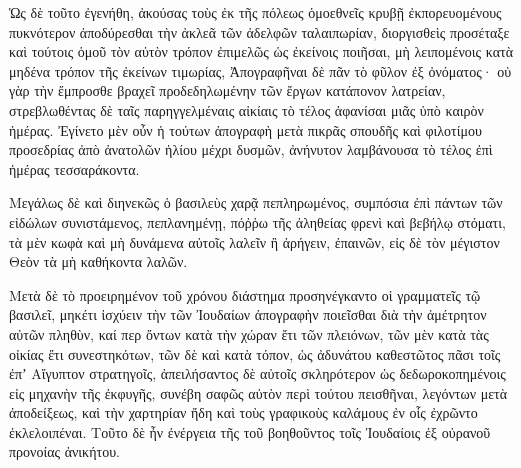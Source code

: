 {\par }{\PP {}Ὡς δὲ τοῦτο ἐγενήθη, ἀκούσας τοὺς ἐκ τῆς πόλεως ὁμοεθνεῖς κρυβῇ ἐκπορευομένους πυκνότερον ἀποδύρεσθαι τὴν ἀκλεᾶ τῶν ἀδελφῶν ταλαιπωρίαν,
διοργισθεὶς προσέταξε καὶ τούτοις ὁμοῦ τὸν αὐτὸν τρόπον ἐπιμελῶς ὡς ἐκείνοις ποιῆσαι, μὴ λειπομένοις κατὰ μηδένα τρόπον τῆς ἐκείνων τιμωρίας, Ἀπογραφῆναι δὲ πᾶν τὸ φῦλον ἐξ ὀνόματος·
οὐ γὰρ τὴν ἔμπροσθε βραχεῖ προδεδηλωμένην τῶν ἔργων κατάπονον λατρείαν, στρεβλωθέντας δὲ ταῖς παρηγγελμέναις αἰκίαις τὸ τέλος ἀφανίσαι μιᾶς ὑπὸ καιρὸν ἡμέρας.
Ἐγίνετο μὲν οὖν ἡ τούτων ἀπογραφὴ μετὰ πικρᾶς σπουδῆς καὶ φιλοτίμου προσεδρίας ἀπὸ ἀνατολῶν ἡλίου μέχρι δυσμῶν, ἀνήνυτον λαμβάνουσα τὸ τέλος ἐπὶ ἡμέρας τεσσαράκοντα.
\par }{\PP {}Μεγάλως δὲ καὶ διηνεκῶς ὁ βασιλεὺς χαρᾷ πεπληρωμένος, συμπόσια ἐπὶ πάντων τῶν εἰδώλων συνιστάμενος, πεπλανημένῃ, πόῤῥω τῆς ἀληθείας φρενὶ καὶ βεβήλῳ στόματι, τὰ μὲν κωφὰ καὶ μὴ δυνάμενα αὐτοῖς λαλεῖν ἢ ἀρήγειν, ἐπαινῶν, εἰς δὲ τὸν μέγιστον Θεὸν τὰ μὴ καθήκοντα λαλῶν.
\par }{\PP {}Μετὰ δὲ τὸ προειρημένον τοῦ χρόνου διάστημα προσηνέγκαντο οἱ γραμματεῖς τῷ βασιλεῖ, μηκέτι ἰσχύειν τὴν τῶν Ἰουδαίων ἀπογραφὴν ποιεῖσθαι διὰ τὴν ἀμέτρητον αὐτῶν πληθὺν, καί περ ὄντων κατὰ τὴν χώραν ἔτι τῶν πλειόνων,
τῶν μὲν κατὰ τὰς οἰκίας ἔτι συνεστηκότων, τῶν δὲ καὶ κατὰ τόπον, ὡς ἀδυνάτου καθεστῶτος πᾶσι τοῖς ἐπʼ Αἴγυπτον στρατηγοῖς,
ἀπειλήσαντος δὲ αὐτοῖς σκληρότερον ὡς δεδωροκοπημένοις εἰς μηχανὴν τῆς ἐκφυγῆς, συνέβη σαφῶς αὐτὸν περὶ τούτου πεισθῆναι,
λεγόντων μετὰ ἀποδείξεως, καὶ τὴν χαρτηρίαν ἤδη καὶ τοὺς γραφικοὺς καλάμους ἐν οἷς ἐχρῶντο ἐκλελοιπέναι.
Τοῦτο δὲ ἦν ἐνέργεια τῆς τοῦ βοηθοῦντος τοῖς Ἰουδαίοις ἐξ οὐρανοῦ προνοίας ἀνικήτου.

}
